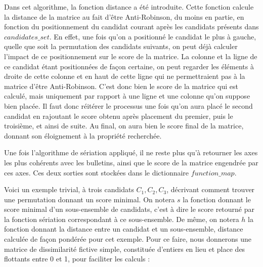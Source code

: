 \documentclass[11pt, a4paper]{article}
\begin{document}
\bigskip

Dans cet algorithme, la fonction distance a \'{e}t\'{e} introduite. Cette fonction calcule la distance de la matrice au fait d'être Anti-Robinson, du moins en partie, en fonction du positionnement du candidat courant apr\`{e}s les candidats présents dans $candidates\_set$. En effet, une fois qu'on a positionné le candidat le plus à gauche, quelle que soit la permutation des candidats suivants, on peut déjà calculer l'impact de ce positionnement sur le score de la matrice. La colonne et la ligne de ce candidat étant positionnées de façon certaine, on peut regarder les éléments à droite de cette colonne et en haut de cette ligne qui ne permettraient pas à la matrice d'être Anti-Robinson. C'est donc bien le score de la matrice qui est calculé, mais uniquement par rapport à une ligne et une colonne qu'on suppose bien placée. Il faut donc réitérer le processus une fois qu'on aura placé le second candidat en rajoutant le score obtenu après placement du premier, puis le troisième, et ainsi de suite. Au final, on aura bien le score final de la matrice, donnant son éloignement à la propriété recherchée.


Une fois l'algorithme de s\'{e}riation appliqu\'{e}, il ne reste plus qu'\`{a} retourner les axes les plus coh\'{e}rents avec les bulletins, ainsi que le score de la matrice engendr\'{e}e par ces axes. Ces deux sorties sont stock\'{e}es dans le dictionnaire $function\_map$.%

\bigskip
Voici un exemple trivial, à trois candidats $C_1, C_2, C_3$, décrivant comment trouver une permutation donnant un score minimal. On notera $s$ la fonction donnant le score minimal d'un sous-ensemble de candidats, c'est à dire le score retourné par la fonction sériation correspondant à ce sous-ensemble. De même, on notera $h$ la fonction donnant la distance entre un candidat et un sous-ensemble, distance calculée de façon pondérée pour cet exemple. Pour ce faire, nous donnerons une matrice de dissimilarité fictive simple, constituée d'entiers en lieu et place des flottants entre 0 et 1, pour faciliter les calculs : 
\end{document}
